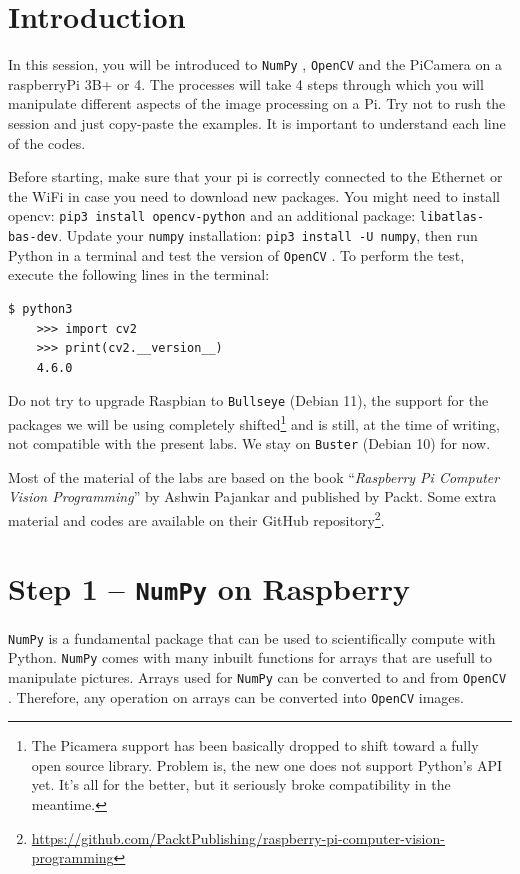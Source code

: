 \documentclass{labo}
\author{}
\newcommand{\numpy}{\texttt{NumPy} }
\newcommand{\opencv}{\texttt{OpenCV} }
\begin{document}

\section*{Introduction}
In this session, you will be introduced to \numpy, \opencv and the PiCamera on a raspberryPi 3B+ or 4. The processes will take 4 steps through which you will manipulate different aspects of the image processing on a Pi. Try not to rush the session and just copy-paste the examples. It is important to understand each line of the codes.

Before starting, make sure that your pi is correctly connected to the Ethernet or the WiFi in case you need to download new packages.
You might need to install opencv: \texttt{pip3 install opencv-python} and an additional package: \texttt{libatlas-bas-dev}.
Update your \texttt{numpy} installation: \texttt{pip3 install -U numpy}, then run Python in a terminal and test the version of \opencv. To perform the test, execute the following lines in the terminal:

\begin{verbatim}
$ python3
	>>> import cv2
	>>> print(cv2.__version__)
	4.6.0
\end{verbatim}

Do not try to upgrade Raspbian to \texttt{Bullseye} (Debian 11), the support for the packages we will be using completely shifted\footnote{The Picamera support has been basically dropped to shift toward a fully open source library. Problem is, the new one does not support Python's API yet. It's all for the better, but it seriously broke compatibility in the meantime.} and is still, at the time of writing, not compatible with the present labs. We stay on \texttt{Buster} (Debian 10) for now.

Most of the material of the labs are based on the book ``\textit{Raspberry Pi Computer Vision Programming}'' by Ashwin Pajankar and published by Packt. Some extra material and codes are available on their GitHub repository\footnote{\url{https://github.com/PacktPublishing/raspberry-pi-computer-vision-programming}}.


\section*{Step 1 -- \texttt{NumPy} on Raspberry}
\numpy is a fundamental package that can be used to scientifically compute with Python. \numpy comes with many inbuilt functions for arrays that are usefull to manipulate pictures. Arrays used for \numpy can be converted to and from \opencv. Therefore, any operation on arrays can be converted into \opencv images.
\end{document}
